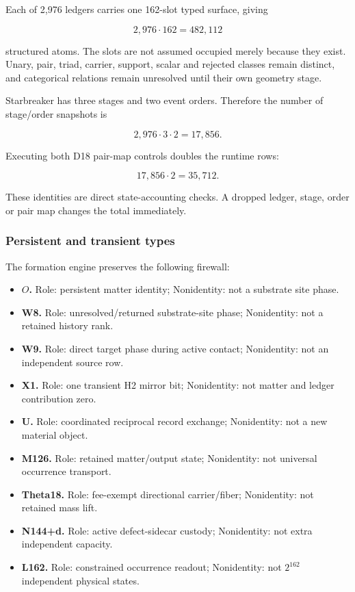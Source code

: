 Each of 2,976 ledgers carries one 162-slot typed surface, giving

\[
2{,}976\cdot162=482{,}112
\]

structured atoms. The slots are not assumed occupied merely because they
exist. Unary, pair, triad, carrier, support, scalar and rejected classes
remain distinct, and categorical relations remain unresolved until their
own geometry stage.

Starbreaker has three stages and two event orders. Therefore the number
of stage/order snapshots is

\[
2{,}976\cdot3\cdot2=17{,}856.
\]

Executing both D18 pair-map controls doubles the runtime rows:

\[
17{,}856\cdot2=35{,}712.
\]

These identities are direct state-accounting checks. A dropped ledger,
stage, order or pair map changes the total immediately.

\subsubsection{Persistent and transient
types}\label{viii-ch08-persistent-and-transient-types}

The formation engine preserves the following firewall:

\begin{itemize}
\tightlist
\item
  \textbf{\(O\).} Role: persistent matter identity; Nonidentity: not a
  substrate site phase.
\item
  \textbf{W8.} Role: unresolved/returned substrate-site phase;
  Nonidentity: not a retained history rank.
\item
  \textbf{W9.} Role: direct target phase during active contact;
  Nonidentity: not an independent source row.
\item
  \textbf{X1.} Role: one transient H2 mirror bit; Nonidentity: not
  matter and ledger contribution zero.
\item
  \textbf{U.} Role: coordinated reciprocal record exchange; Nonidentity:
  not a new material object.
\item
  \textbf{M126.} Role: retained matter/output state; Nonidentity: not
  universal occurrence transport.
\item
  \textbf{Theta18.} Role: fee-exempt directional carrier/fiber;
  Nonidentity: not retained mass lift.
\item
  \textbf{N144+d.} Role: active defect-sidecar custody; Nonidentity: not
  extra independent capacity.
\item
  \textbf{L162.} Role: constrained occurrence readout; Nonidentity: not
  \(2^{162}\) independent physical states.
\end{itemize}


